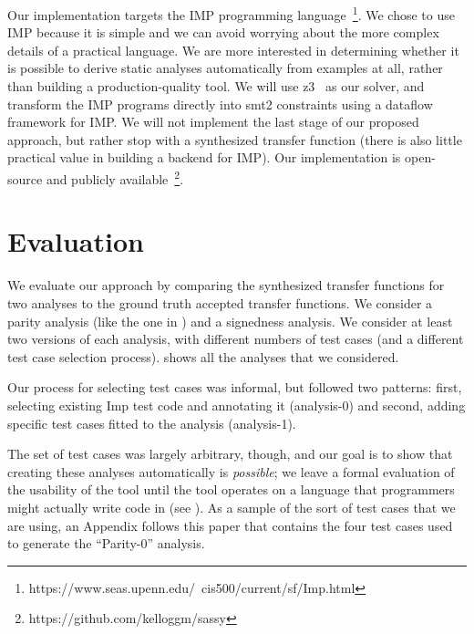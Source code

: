 \documentclass[10pt,conference]{IEEEtran}
\begin{document}
Our implementation targets the IMP programming language~\footnote{https://www.seas.upenn.edu/~cis500/current/sf/Imp.html}.
We chose to use IMP because it is simple and we can avoid worrying
about the more complex details of a practical language. We are more interested
in determining whether it is possible to derive static analyses automatically
from examples at all, rather than building a production-quality tool.
We will use z3~\cite{z3} as our solver, and transform the IMP programs directly
into smt2 constraints using a dataflow framework for IMP.
We will not
implement the last stage of our proposed approach, but rather stop with a
synthesized transfer function (there is also little practical value in building
a backend for IMP). Our implementation is open-source and publicly
available~\footnote{https://github.com/kelloggm/sassy}.

\section{Evaluation}
\label{sec-eval}

We evaluate our approach by comparing the synthesized transfer
functions for two analyses to the ground truth accepted transfer
functions. We consider a parity analysis (like the one in )
and a signedness analysis.
We consider at least two versions of each analysis, with different
numbers of test cases (and a different test case selection process).
 shows all the analyses that we considered.

Our process for selecting test cases was informal, but followed two 
patterns:  first, selecting existing Imp test code and annotating it
(analysis-0) and second, adding specific test cases fitted to the analysis (analysis-1).

The set of test cases was largely arbitrary, though, and our goal is to show that 
creating these analyses automatically is \emph{possible}; 
we leave a formal evaluation of the usability of the
tool until the tool operates on a language that programmers might
actually write code in (see ). As a sample of the sort of
test cases that we are using, an Appendix follows this paper that contains
the four test cases used to generate the ``Parity-0'' analysis.
\end{document}
